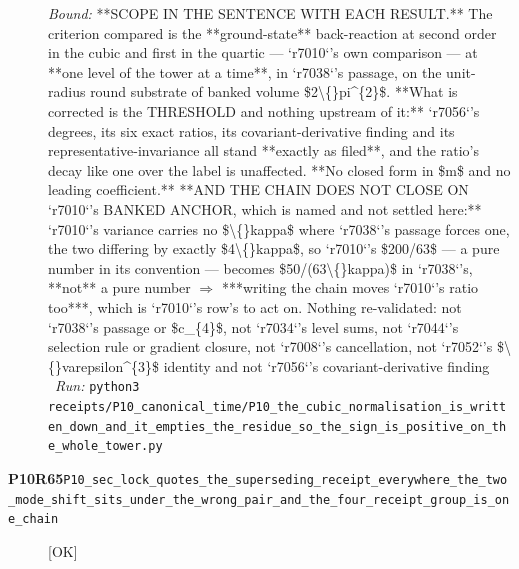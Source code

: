 \begin{description}
 \emph{Bound:}  **SCOPE IN THE SENTENCE WITH EACH RESULT.** The criterion compared is the **ground-state** back-reaction at second order in the cubic and first in the quartic --- `r7010`'s own comparison --- at **one level of the tower at a time**, in `r7038`'s passage, on the unit-radius round substrate of banked volume \$2\textbackslash\{\}pi\textasciicircum{}\{2\}\$. **What is corrected is the THRESHOLD and nothing upstream of it:** `r7056`'s degrees, its six exact ratios, its covariant-derivative finding and its representative-invariance all stand **exactly as filed**, and the ratio's decay like one over the label is unaffected. **No closed form in \$m\$ and no leading coefficient.**  **AND THE CHAIN DOES NOT CLOSE ON `r7010`'s BANKED ANCHOR, which is named and not settled here:** `r7010`'s variance carries no \$\textbackslash\{\}kappa\$ where `r7038`'s passage forces one, the two differing by exactly \$4\textbackslash\{\}kappa\$, so `r7010`'s \$200/63\$ --- a pure number in its convention --- becomes \$50/(63\textbackslash\{\}kappa)\$ in `r7038`'s, **not** a pure number \ensuremath{\Rightarrow} ***writing the chain moves `r7010`'s ratio too***, which is `r7010`'s row's to act on. Nothing re-validated: not `r7038`'s passage or \$c\_\{4\}\$, not `r7034`'s level sums, not `r7044`'s selection rule or gradient closure, not `r7008`'s cancellation, not `r7052`'s \$\textbackslash\{\}varepsilon\textasciicircum{}\{3\}\$ identity and not `r7056`'s covariant-derivative finding
\ \emph{Run:} \texttt{python3 receipts/P10\_canonical\_time/P10\_the\_cubic\_normalisation\_is\_written\_down\_and\_it\_empties\_the\_residue\_so\_the\_sign\_is\_positive\_on\_the\_whole\_tower.py}
\item[\rcptlabel{P10_sec_lock_quotes_the_superseding_receipt_everywhere_the_two_mode_shift_sits_under_the_wrong_pair_and_the_four_receipt_group_is_one_chain}{P10R65}\textbf{P10R65}\quad\texttt{P10\_sec\_lock\_quotes\_the\_superseding\_receipt\_everywhere\_the\_two\_mode\_shift\_sits\_under\_the\_wrong\_pair\_and\_the\_four\_receipt\_group\_is\_one\_chain}]\hfill\textsf{[OK]}\\

\end{description}
